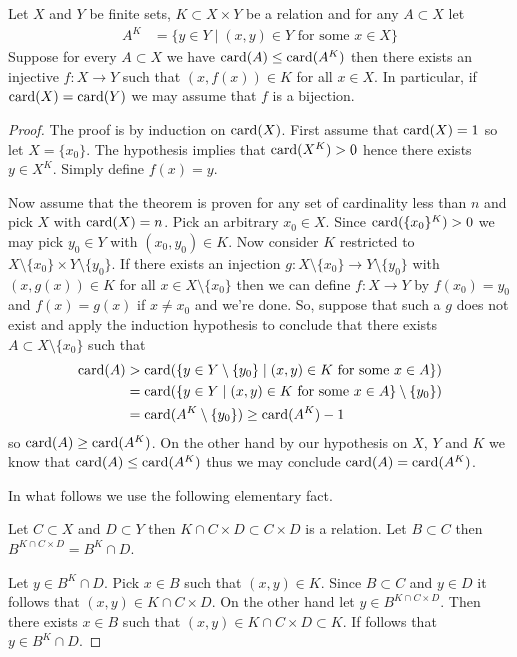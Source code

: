 \begin{thm}\label{MarriageTheorem}Let $X$ and $Y$ be finite sets, $K \subset X \times Y$ be a relation and for any $A \subset X$ let 
\begin{align*}
A^K &= \lbrace y \in Y \mid (x,y) \in Y \text{ for some } x \in X \rbrace
\end{align*}
Suppose for every $A \subset X$ we have $\operatorname*{card}(A) \leq \operatorname*{card}(A^K)$ then there exists an injective $f : X \to Y$ such that $(x,f(x)) \in K$ for all $x \in X$.  In particular, if $\operatorname*{card}(X) = \operatorname*{card}(Y)$ we may assume that $f$ is a bijection.
\end{thm}
\begin{proof}
The proof is by induction on $\operatorname*{card}(X)$.  First assume that $\operatorname*{card}(X) = 1$ so let $X = \lbrace x_0 \rbrace$.  The hypothesis implies that $\operatorname*{card}(X^K) > 0$ hence there exists $y \in X^K$.  Simply define $f(x) = y$.  

Now assume that the theorem is proven for any set of cardinality less than $n$ and pick $X$ with $\operatorname*{card}(X) = n$.  Pick an arbitrary $x_0 \in X$.  Since $\operatorname*{card}(\lbrace x_0 \rbrace^K) > 0$ we may pick $y_0 \in Y$ with $(x_0, y_0) \in K$.  Now consider $K$ restricted to $X \setminus \lbrace x_0 \rbrace \times Y \setminus \lbrace y_0 \rbrace$.  If there exists an injection $g : X \setminus \lbrace x_0 \rbrace  \to Y \setminus \lbrace y_0 \rbrace$ with $(x, g(x)) \in K$ for all $x \in X \setminus \lbrace x_0 \rbrace$ then we can define $f : X \to Y$ by $f(x_0) = y_0$ and $f(x) = g(x)$ if $x \neq x_0$ and we're done.  So, suppose that such a $g$ does not exist and apply the induction hypothesis to conclude that there exists $A \subset X \setminus \lbrace x_0 \rbrace$ such that 
\begin{align*}
\operatorname*{card}(A) &> \operatorname*{card}(\lbrace y \in Y \setminus \lbrace y_0 \rbrace \mid (x,y) \in K \text{ for some } x \in A \rbrace) \\
&=\operatorname*{card}(\lbrace y \in Y \mid (x,y) \in K \text{ for some } x \in A \rbrace \setminus \lbrace y_0 \rbrace)  \\
&= \operatorname*{card}(A^K \setminus \lbrace y_0 \rbrace) \geq \operatorname*{card}(A^K) - 1
\end{align*}
so $\operatorname*{card}(A) \geq \operatorname*{card}(A^K)$.  On the other hand by our hypothesis on $X$, $Y$ and $K$ we know that $\operatorname*{card}(A) \leq \operatorname*{card}(A^K)$ thus we may conclude $\operatorname*{card}(A) = \operatorname*{card}(A^K)$.    

In what follows we use the following elementary fact.
\begin{clm}Let $C \subset X$ and $D \subset Y$ then $K \cap C \times D \subset C \times D$ is a relation.  Let $B \subset C$ then $B^{K \cap C \times D} = B^K \cap D$.
\end{clm}
Let $y \in B^K \cap D$.  Pick $x \in B$ such that $(x,y) \in K$.  Since $B \subset C$ and $y \in D$ it follows that $(x,y) \in K \cap C \times D$.  On the other hand let $y \in B^{K \cap C \times D}$.  Then there exists $x \in B$ such that $(x,y) \in K \cap C \times D \subset K$.  If follows that $y \in B^K \cap D$.


\end{proof}
